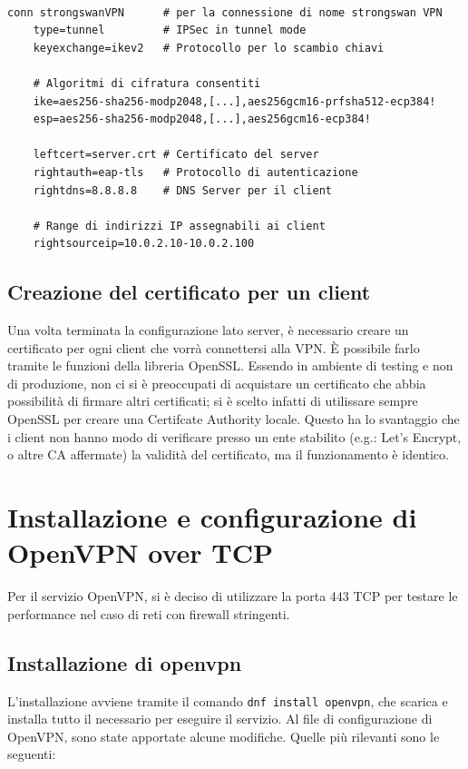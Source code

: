 \begin{verbatim}

conn strongswanVPN      # per la connessione di nome strongswan VPN
    type=tunnel         # IPSec in tunnel mode
    keyexchange=ikev2   # Protocollo per lo scambio chiavi

    # Algoritmi di cifratura consentiti
    ike=aes256-sha256-modp2048,[...],aes256gcm16-prfsha512-ecp384!
    esp=aes256-sha256-modp2048,[...],aes256gcm16-ecp384!
    
    leftcert=server.crt # Certificato del server
    rightauth=eap-tls   # Protocollo di autenticazione
    rightdns=8.8.8.8    # DNS Server per il client

    # Range di indirizzi IP assegnabili ai client
    rightsourceip=10.0.2.10-10.0.2.100
\end{verbatim}

\subsection{Creazione del certificato per un client}
Una volta terminata la configurazione lato server, è necessario creare un certificato per ogni client che vorrà connettersi alla VPN. È possibile farlo tramite le funzioni della libreria OpenSSL. Essendo in ambiente di testing e non di produzione, non ci si è preoccupati di acquistare un certificato che abbia possibilità di firmare altri certificati; si è scelto infatti di utilissare sempre OpenSSL per creare una Certifcate Authority locale. Questo ha lo svantaggio che i client non hanno modo di verificare presso un ente stabilito (e.g.: Let's Encrypt, o altre CA affermate) la validità del certificato, ma il funzionamento è identico.

\section{Installazione e configurazione di OpenVPN over TCP}
Per il servizio OpenVPN, si è deciso di utilizzare la porta 443 TCP per testare le performance nel caso di reti con firewall stringenti.
\subsection{Installazione di openvpn}
L'installazione avviene tramite il comando \texttt{dnf install openvpn}, che scarica e installa tutto il necessario per eseguire il servizio.
Al file di configurazione di OpenVPN, sono state apportate alcune modifiche. Quelle più rilevanti sono le seguenti: 

